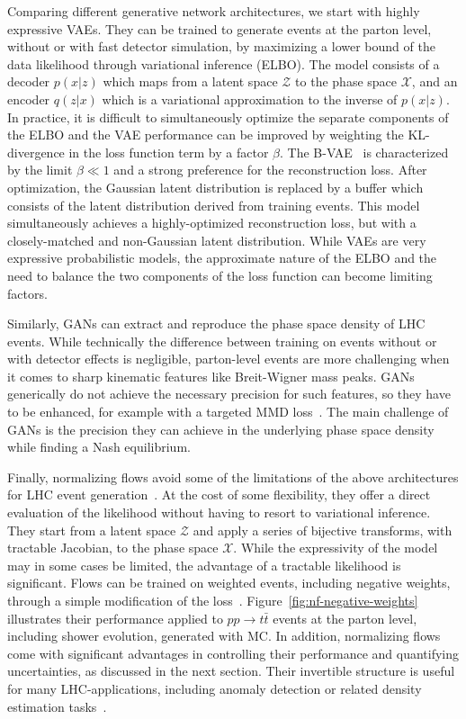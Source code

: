 \documentclass[submission,Phys]{SciPost}
\begin{document}
Comparing different generative network architectures, we start with highly expressive VAEs. They can be trained to generate events at the parton level, without or with fast detector simulation, by maximizing a lower bound of the data likelihood through variational inference (ELBO). The model consists of a decoder $p(x|z)$ which maps from a latent space $\mathcal{Z}$ to the phase space $\mathcal{X}$, and an encoder $q(z|x)$ which is a variational approximation to the inverse of $p(x|z)$. In practice, it is difficult to simultaneously optimize the separate components of the ELBO and the VAE performance can be improved by weighting the KL-divergence in the loss function term by a factor $\beta$. The B-VAE~\cite{Otten:2019hhl} is characterized by the limit $\beta \ll 1$ and a strong preference for the reconstruction loss.  After optimization, the Gaussian latent distribution is replaced by a buffer which consists of the latent distribution derived from training events. This model simultaneously achieves a highly-optimized reconstruction loss, but with a closely-matched and non-Gaussian latent distribution. While VAEs are very expressive probabilistic models, the approximate nature of the ELBO and the need to balance the two components of the loss function can become limiting factors.

Similarly, GANs can extract and reproduce the phase space density of LHC events. While technically the difference between training on events without or with detector effects is negligible, parton-level events are more challenging when it comes to sharp kinematic features like Breit-Wigner mass peaks. GANs generically do not achieve the necessary precision for such features, so they have to be enhanced, for example with a targeted MMD loss~\cite{Butter:2019cae}. The main challenge of GANs is the precision they can achieve in the underlying phase space density while finding a Nash equilibrium.

Finally, normalizing flows avoid some of the limitations of the above architectures for LHC event generation~\cite{Stienen:2020gns,Bellagente:2021yyh,Butter:2021csz}. At the cost of some flexibility, they offer a direct evaluation of the likelihood without having to resort to variational inference. They start from a latent space $\mathcal{Z}$ and apply a series of bijective transforms, with tractable Jacobian, to the phase space $\mathcal{X}$. While the expressivity of the model may in some cases be limited, the advantage of a tractable likelihood is significant. Flows can be trained on weighted events, including negative weights, through a simple modification of the loss~\cite{Stienen:2020gns}. Figure~\ref{fig:nf-negative-weights} illustrates their performance applied to $pp \to t\bar{t}$ events at the parton level, including shower evolution, generated with MC\@@NLO. In addition, normalizing flows come with significant advantages in controlling their performance and quantifying uncertainties, as discussed in the next section. Their invertible structure is useful for many LHC-applications, including anomaly detection or related density estimation tasks~\cite{Caron:2021wmq,Hallin:2021wme,Nachman:2020lpy,Buss:2022lxw}.
\end{document}
